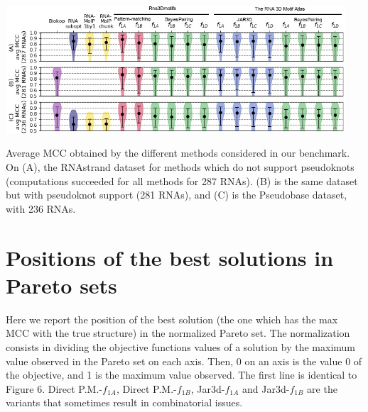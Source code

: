 \documentclass{article}
\begin{document}
\vspace{0.5cm}
\includegraphics[width=0.95\textwidth]{fig/Benchmark_avg.jpg}
\vspace{0.5cm}

Average MCC obtained by the different methods considered in our benchmark. On (A), the RNAstrand dataset for methods which do not support pseudoknots (computations succeeded for all methods for 287 RNAs). (B) is the same dataset but with pseudoknot support (281 RNAs), and (C) is the Pseudobase dataset, with 236 RNAs.


\newpage
\section{Positions of the best solutions in Pareto sets}
Here we report the position of the best solution (the one which has the max MCC with the true structure) in the normalized Pareto set. The normalization consists in dividing the objective functions values of a solution by the maximum value observed in the Pareto set on each axis. Then, 0 on an axis is the value 0 of the objective, and 1 is the maximum value observed.
The first line is identical to Figure 6. Direct P.M.-$f_{1A}$, Direct P.M.-$f_{1B}$, Jar3d-$f_{1A}$ and Jar3d-$f_{1B}$ are the variants that sometimes result in combinatorial issues.
\end{document}
